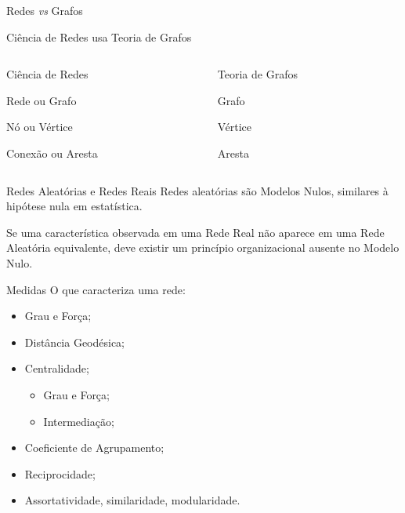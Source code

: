 \documentclass[10pt, hyperref={pdfpagelabels=false, unicode=true}, aspectratio=169]{beamer}
\begin{document}
\begin{frame}[c, label=redes-vs-grafos]{Redes \textit{vs} Grafos}
  \begin{center}
    \Large
    Ciência de Redes \alert{usa} Teoria de Grafos
    
    \vspace{\baselineskip}
    
    \begin{columns}[T,onlytextwidth]
      \begin{column}{0.5\textwidth}
        \centering
        \alert{Ciência de Redes}

        \large
        Rede ou Grafo
        
        Nó ou Vértice
        
        Conexão ou Aresta
      \end{column}

      \begin{column}{0.5\textwidth}
        \centering
        \alert{Teoria de Grafos}

        \large
        Grafo

        Vértice

        Aresta
      \end{column}
    \end{columns}
  \end{center}
\end{frame}

\begin{frame}[label=redes]{Redes Aleatórias e Redes Reais}
\large
Redes aleatórias são \alert{Modelos Nulos}, similares à hipótese nula em estatística.

Se uma característica observada em uma \alert{Rede Real} não aparece em uma \alert{Rede Aleatória} equivalente, deve existir um \alert{princípio organizacional} ausente no Modelo Nulo.
\end{frame}

\begin{frame}[label=medidas]{Medidas}
  \large
  O que caracteriza uma rede:
  \begin{itemize}
    \item Grau e Força;
    \item Distância Geodésica;
    \item Centralidade;
    \begin{itemize}
      \item Grau e Força;
      \item Intermediação;
    \end{itemize}
    \item Coeficiente de Agrupamento;
    \item Reciprocidade;
    \item Assortatividade, similaridade, modularidade.
  \end{itemize}
\end{frame}
\end{document}
